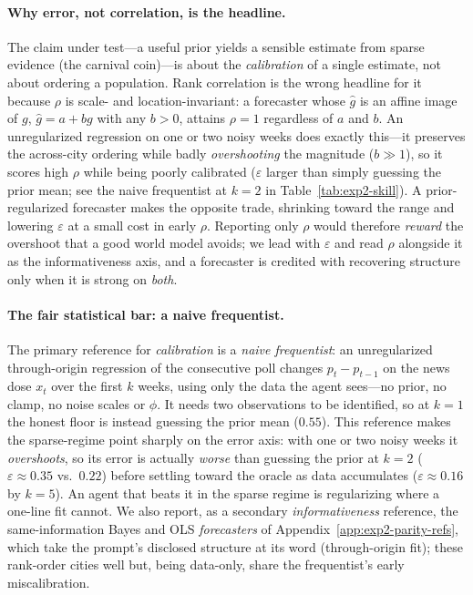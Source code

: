 \documentclass{article} %
\begin{document}
\paragraph{Why error, not correlation, is the headline.}  The claim under test---a useful prior yields
a sensible estimate from sparse evidence (the carnival coin)---is about the \emph{calibration} of a
single estimate, not about ordering a population.  Rank correlation is the wrong headline for it
because $\rho$ is scale- and location-invariant: a forecaster whose $\hat g$ is an affine image of
$g$, $\hat g=a+bg$ with any $b>0$, attains $\rho=1$ regardless of $a$ and $b$.  An unregularized
regression on one or two noisy weeks does exactly this---it preserves the across-city ordering while
badly \emph{overshooting} the magnitude ($b\gg1$), so it scores high $\rho$ while being poorly
calibrated ($\varepsilon$ larger than simply guessing the prior mean; see the naive frequentist at
$k{=}2$ in Table~\ref{tab:exp2-skill}).  A prior-regularized forecaster makes the opposite trade,
shrinking toward the range and lowering $\varepsilon$ at a small cost in early $\rho$.  Reporting only
$\rho$ would therefore \emph{reward} the overshoot that a good world model avoids; we lead with
$\varepsilon$ and read $\rho$ alongside it as the informativeness axis, and a forecaster is credited
with recovering structure only when it is strong on \emph{both}.

\paragraph{The fair statistical bar: a naive frequentist.}  The primary reference for
\emph{calibration} is a \emph{naive frequentist}: an unregularized through-origin regression of the
consecutive poll changes $p_t-p_{t-1}$ on the news dose $x_t$ over the first $k$ weeks, using only
the data the agent sees---no prior, no clamp, no noise scales or $\phi$.  It needs two observations
to be identified, so at $k{=}1$ the honest floor is instead guessing the prior mean ($0.55$).  This
reference makes the sparse-regime point sharply on the error axis: with one or two noisy weeks it
\emph{overshoots}, so its error is actually \emph{worse} than guessing the prior at $k{=}2$
($\varepsilon\approx0.35$ vs.\ $0.22$) before settling toward the oracle as data accumulates
($\varepsilon\approx0.16$ by $k{=}5$).  An agent that beats it in the sparse regime is regularizing
where a one-line fit cannot.  We also report, as a secondary \emph{informativeness} reference, the
same-information Bayes and OLS \emph{forecasters} of Appendix~\ref{app:exp2-parity-refs}, which take
the prompt's disclosed structure at its word (through-origin fit); these rank-order cities well but,
being data-only, share the frequentist's early miscalibration.
\end{document}

